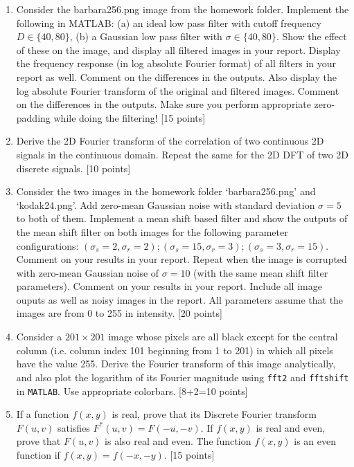 \documentclass[11pt]{article}
\begin{document}
\begin{enumerate}
\item Consider the barbara256.png image from the homework folder. Implement the following in MATLAB: (a) an ideal low pass filter with cutoff frequency $D \in \{40, 80\}$, (b) a Gaussian low pass filter with $\sigma \in \{40,80\}$. Show the effect of these on the image, and display all filtered images in your report. Display the frequency response (in log absolute Fourier format) of all filters in your report as well. Comment on the differences in the outputs. Also display the log absolute Fourier transform of the original and filtered images. Comment on the differences in the outputs. Make sure you perform appropriate zero-padding while doing the filtering! \textsf{[15 points]}

\item Derive the 2D Fourier transform of the correlation of two continuous 2D signals in the continuous domain. Repeat the same for the 2D DFT of two 2D discrete signals. \textsf{[10 points]}

\item Consider the two images in the homework folder `barbara256.png' and `kodak24.png'. Add zero-mean Gaussian noise with standard deviation $\sigma = 5$ to both of them. Implement a mean shift based filter and show the outputs of the mean shift filter on both images for the following parameter configurations: $(\sigma_s = 2, \sigma_r = 2); (\sigma_s = 15, \sigma_r = 3); (\sigma_s = 3, \sigma_r = 15)$. Comment on your results in your report. Repeat when the image is corrupted with zero-mean Gaussian noise of $\sigma = 10$ (with the same mean shift filter parameters). Comment on your results in your report. Include all image ouputs as well as noisy images in the report. All parameters assume that the images are from 0 to 255 in intensity. \textsf{[20 points]}

\item Consider a $201 \times 201$ image whose pixels are all black except for the central column (i.e. column index 101 beginning from 1 to 201) in which all pixels have the value 255. Derive the Fourier transform of this image analytically, and also plot the logarithm of its Fourier magnitude using \texttt{fft2} and \texttt{fftshift} in \texttt{MATLAB}. Use appropriate colorbars.  
\textsf{[8+2=10 points]}

\item If a function $f(x,y)$ is real, prove that its Discrete Fourier transform $F(u,v)$ satisfies $F^*(u,v) = F(-u,-v)$. If $f(x,y)$ is real and even, prove that $F(u,v)$ is also real and even. The function $f(x,y)$ is an even function if $f(x,y) = f(-x,-y)$. \textsf{[15 points]}


\end{enumerate}
\end{document}
